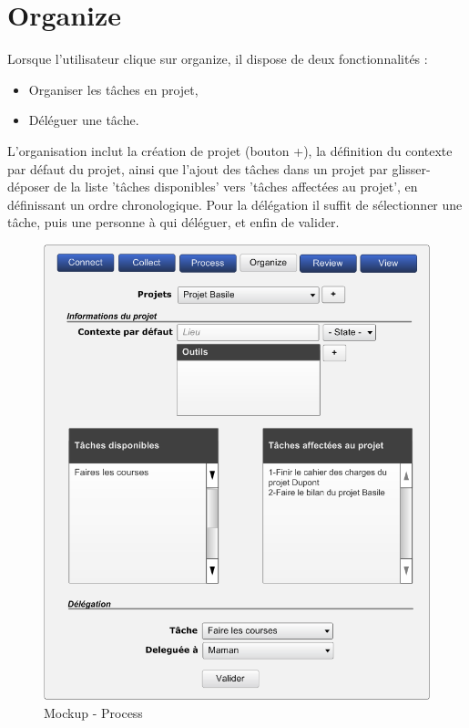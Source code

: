 \section{Organize}
Lorsque l'utilisateur clique sur organize, il dispose de deux fonctionnalités :
\begin{itemize}
  \item Organiser les tâches en projet,
  \item Déléguer une tâche.
\end{itemize}
L'organisation inclut la création de projet (bouton +), la définition du
contexte par défaut du projet, ainsi que l'ajout des tâches dans un projet par
glisser-déposer de la liste 'tâches disponibles' vers 'tâches affectées au
projet', en définissant un ordre chronologique.
Pour la délégation il suffit de sélectionner une tâche, puis une personne à qui
déléguer, et enfin de valider.

\begin{figure}[H]
  \begin{center}
  \includegraphics[scale=0.5]{livrable2/images/organize.png}
  \caption{Mockup - Process}
  \end{center}
\end{figure}

